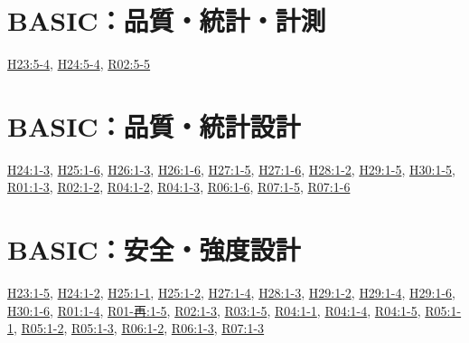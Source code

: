 \section{BASIC：品質・統計・計測}
\hyperref[q:h23-reg-basic-5-4]{H23:5-4}, \hyperref[q:h24-reg-basic-5-4]{H24:5-4}, \hyperref[q:r02-reg-basic-5-5]{R02:5-5}
\section{BASIC：品質・統計設計}
\hyperref[q:h24-reg-basic-1-3]{H24:1-3}, \hyperref[q:h25-reg-basic-1-6]{H25:1-6}, \hyperref[q:h26-reg-basic-1-3]{H26:1-3}, \hyperref[q:h26-reg-basic-1-6]{H26:1-6}, \hyperref[q:h27-reg-basic-1-5]{H27:1-5}, \hyperref[q:h27-reg-basic-1-6]{H27:1-6}, \hyperref[q:h28-reg-basic-1-2]{H28:1-2}, \hyperref[q:h29-reg-basic-1-5]{H29:1-5}, \hyperref[q:h30-reg-basic-1-5]{H30:1-5}, \hyperref[q:r01-reg-basic-1-3]{R01:1-3}, \hyperref[q:r02-reg-basic-1-2]{R02:1-2}, \hyperref[q:r04-reg-basic-1-2]{R04:1-2}, \hyperref[q:r04-reg-basic-1-3]{R04:1-3}, \hyperref[q:r06-reg-basic-1-6]{R06:1-6}, \hyperref[q:r07-reg-basic-1-5]{R07:1-5}, \hyperref[q:r07-reg-basic-1-6]{R07:1-6}
\section{BASIC：安全・強度設計}
\hyperref[q:h23-reg-basic-1-5]{H23:1-5}, \hyperref[q:h24-reg-basic-1-2]{H24:1-2}, \hyperref[q:h25-reg-basic-1-1]{H25:1-1}, \hyperref[q:h25-reg-basic-1-2]{H25:1-2}, \hyperref[q:h27-reg-basic-1-4]{H27:1-4}, \hyperref[q:h28-reg-basic-1-3]{H28:1-3}, \hyperref[q:h29-reg-basic-1-2]{H29:1-2}, \hyperref[q:h29-reg-basic-1-4]{H29:1-4}, \hyperref[q:h29-reg-basic-1-6]{H29:1-6}, \hyperref[q:h30-reg-basic-1-6]{H30:1-6}, \hyperref[q:r01-reg-basic-1-4]{R01:1-4}, \hyperref[q:r01-ret-basic-1-5]{R01-再:1-5}, \hyperref[q:r02-reg-basic-1-3]{R02:1-3}, \hyperref[q:r03-reg-basic-1-5]{R03:1-5}, \hyperref[q:r04-reg-basic-1-1]{R04:1-1}, \hyperref[q:r04-reg-basic-1-4]{R04:1-4}, \hyperref[q:r04-reg-basic-1-5]{R04:1-5}, \hyperref[q:r05-reg-basic-1-1]{R05:1-1}, \hyperref[q:r05-reg-basic-1-2]{R05:1-2}, \hyperref[q:r05-reg-basic-1-3]{R05:1-3}, \hyperref[q:r06-reg-basic-1-2]{R06:1-2}, \hyperref[q:r06-reg-basic-1-3]{R06:1-3}, \hyperref[q:r07-reg-basic-1-3]{R07:1-3}
